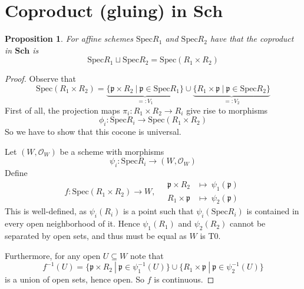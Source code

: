\documentclass{scrartcl}
\newcommand{\p}{\mathfrak{p}}
\newcommand{\Sch}{\mathrm{\textbf{Sch}}}
\newcommand{\Spec}{\mathrm{Spec}}
\renewcommand{\O}{\mathcal{O}}
\newtheorem{prop}{Proposition}[section]
\theoremstyle{definition}
\begin{document}
\section{Coproduct (gluing) in $\Sch$}

\begin{prop}
    For affine schemes $\Spec R_1$ and $\Spec R_2$ have that the coproduct in $\Sch$ is
    \begin{equation*}
        \Spec R_1 \sqcup \Spec R_2 = \Spec(R_1 \times R_2)
    \end{equation*}
\end{prop}
\begin{proof}
    Observe that
    \begin{equation*}
        \Spec(R_1 \times R_2) = \underbrace{\{ \p \times R_2 \ | \ \p \in \Spec R_1 \}}_{=: V_1} \cup \underbrace{\{ R_1 \times \p \ | \ \p \in \Spec R_2 \}}_{=: V_2}
    \end{equation*}
    First of all, the projection maps $\pi_i: R_1 \times R_2 \to R_i$ give rise to morphisms
    \begin{equation*}
        \phi_i: \Spec R_i \to \Spec(R_1 \times R_2)
    \end{equation*}
    So we have to show that this cocone is universal.

    Let $(W, \O_W)$ be a scheme with morphisms
    \begin{equation*}
        \psi_i: \Spec R_i \to (W, \O_W)
    \end{equation*}
    Define
    \begin{equation*}
        f: \Spec(R_1 \times R_2) \to W, \quad \begin{matrix*}
            \p \times R_2 &\mapsto\ \psi_1(\p) \\
            R_1 \times \p &\mapsto\ \psi_2(\p)
        \end{matrix*}
    \end{equation*}
    This is well-defined, as $\psi_i(R_i)$ is a point such that $\psi_i(\Spec R_i)$ is contained in every open neighborhood of it.
    Hence $\psi_1(R_1)$ and $\psi_2(R_2)$ cannot be separated by open sets, and thus must be equal as $W$ is T0.

    Furthermore, for any open $U \subseteq W$ note that
    \begin{equation*}
        f^{-1}(U) = \{ \p \times R_2 \ | \ \p \in \psi_1^{-1}(U) \} \cup \{ R_1 \times \p \ | \ \p \in \psi_2^{-1}(U) \}
    \end{equation*}
    is a union of open sets, hence open.
    So $f$ is continuous.


\end{proof}
\end{document}
